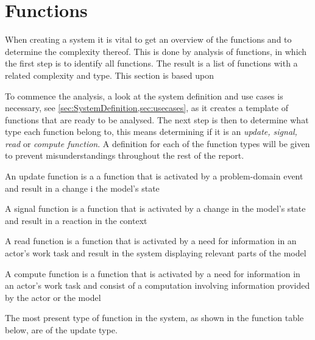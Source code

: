\section{Functions}
When creating a system it is vital to get an overview of the functions and to determine the complexity thereof.
This is done by analysis of functions, in which the first step is to identify all functions.
The result is a list of functions with a related complexity and type.
This section is based upon\citep[ch.~7]{Rod-Aalborg}

To commence the analysis, a look at the system definition and use cases is necessary, see \cref{sec:SystemDefinition,sec:usecases}, as it creates a template of functions that are ready to be analysed.
The next step is then to determine what type each function belong to, this means determining if it is an \textit{update, signal, read} or \textit{compute function}.
A definition for each of the function types will be given to prevent misunderstandings throughout the rest of the report. \cite[p.~140]{Rod-Aalborg}

\begin{defn}
An update function is a a function that is activated by a problem-domain event and result in a change i the model's state
\end{defn}

\begin{defn}
A signal function is a function that is activated by a change in the model's state and result in a reaction in the context
\end{defn}

\begin{defn}
A read function is a function that is activated by a need for information in an actor's work task and result in the system displaying relevant parts of the model
\end{defn}

\begin{defn}
A compute function is a function that is activated by a need for information in an actor's work task and consist of a computation involving information provided by the actor or the model
\end{defn}

The most present type of function in the system, as shown in the function table below, are of the update type.

